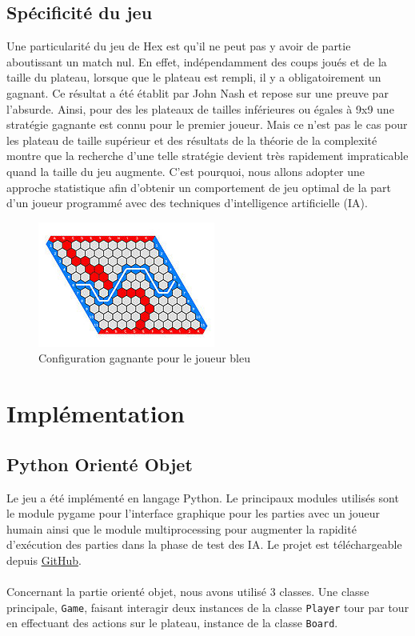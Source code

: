 \documentclass[a4paper]{article}
\theoremstyle{definition}
\begin{document}
\subsection{Spécificité du jeu}

Une particularité du jeu de Hex est qu'il ne peut pas y avoir de partie aboutissant un match nul. En effet, indépendamment des coups joués et de la taille du plateau, lorsque que le plateau est rempli, il y a obligatoirement un gagnant. Ce résultat a été établit par John Nash et repose sur une preuve par l'absurde.
Ainsi, pour des les plateaux de tailles inférieures ou égales à 9x9 une stratégie gagnante est connu pour le premier joueur. Mais ce n'est pas le cas pour les plateau de taille supérieur et des résultats de la théorie de la complexité montre que la recherche d'une telle stratégie devient très rapidement impraticable quand la taille du jeu augmente. C'est pourquoi, nous allons adopter une approche statistique afin d'obtenir un comportement de jeu optimal de la part d'un joueur programmé avec des techniques d'intelligence artificielle (IA).

\begin{figure}[h]
	\centering
	\includegraphics[scale=1]{11x11_gagnant.jpg}
	\caption{Configuration gagnante pour le joueur bleu}
\end{figure}

\section{Implémentation}

\subsection{Python Orienté Objet}

Le jeu a été implémenté en langage Python. Le principaux modules utilisés sont le module pygame pour l'interface graphique pour les parties avec un joueur humain ainsi que le module multiprocessing pour augmenter la rapidité d'exécution des parties dans la phase de test des IA. Le projet est téléchargeable depuis \href{https://github.com/Maxime-LP/Hex-Game}{GitHub}.\\
\\
Concernant la partie orienté objet, nous avons utilisé 3 classes. Une classe principale, \texttt{Game}, faisant interagir deux instances de la classe \texttt{Player} tour par tour en effectuant des actions sur le plateau, instance de la classe \texttt{Board}.
\end{document}
